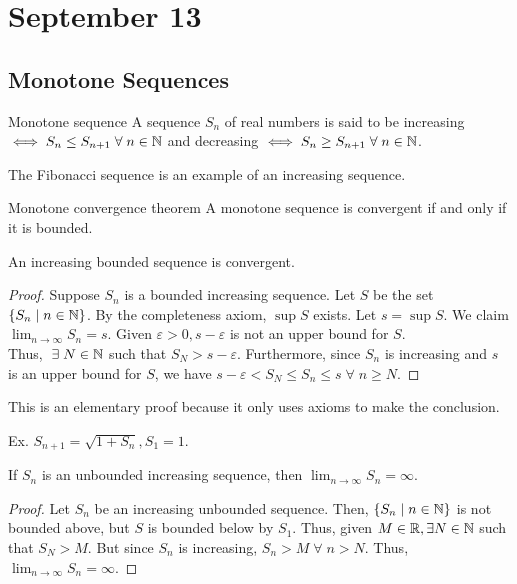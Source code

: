 \chapter{September 13}

\section{Monotone Sequences}
\begin{definition}{Monotone sequence}{}
    A sequence $S_n$ of real numbers is said to be increasing $\iff S_n \leq S_{n+1} \;\forall\; n \in \mathbb{N}$ and decreasing $\iff S_n \geq S_{n+1} \;\forall\; n \in \mathbb{N}$.
\end{definition}
\begin{note}
    The Fibonacci sequence is an example of an increasing sequence.
\end{note}

\begin{definition}{Monotone convergence theorem}{}
    A monotone sequence is convergent if and only if it is bounded.
\end{definition}

\begin{theorem}{}{}
    An increasing bounded sequence is convergent.
\end{theorem}
\begin{proof}
    Suppose $S_n$ is a bounded increasing sequence. Let $S$ be the set $\{S_n \mid n \in \mathbb{N}\}$. By the completeness axiom, $\sup S$ exists. Let $s = \sup S$. We claim $\lim_{n \to \infty} S_n = s$. Given $\varepsilon > 0, s - \varepsilon$ is not an upper bound for $S$. \\ Thus, $\;\exists\; N \in \mathbb{N}$ such that $S_N > s - \varepsilon$. Furthermore, since $S_n$ is increasing and $s$ is an upper bound for $S$, we have $s - \varepsilon < S_N \leq S_n \leq s \;\forall\; n \geq N$.
\end{proof}
\begin{note}
    This is an elementary proof because it only uses axioms to make the conclusion.
\end{note}
Ex. $S_{n+1} = \sqrt{1 + S_n}, S_1 = 1$.


\begin{theorem}{}{}
    If $S_n$ is an unbounded increasing sequence, then $\lim_{n \to \infty} S_n = \infty$.
\end{theorem}
\begin{proof}
    Let $S_n$ be an increasing unbounded sequence. Then, $\{S_n \mid n \in \mathbb{N}\}$ is not bounded above, but $S$ is bounded below by $S_1$. Thus, given $M \in \mathbb{R}, \exists N \in \mathbb{N}$ such that $S_N > M$. But since $S_n$ is increasing, $S_n > M \;\forall\; n > N$. Thus, $\lim_{n \to \infty} S_n = \infty$.
\end{proof}